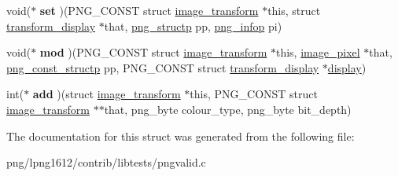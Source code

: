 \begin{DoxyCompactItemize}
\item 
\hypertarget{structimage__transform_a46bbeb277b3ae87e41476157d5fa550b}{void($\ast$ {\bfseries set} )(P\+N\+G\+\_\+\+C\+O\+N\+S\+T struct \hyperlink{structimage__transform}{image\+\_\+transform} $\ast$this, struct \hyperlink{structtransform__display}{transform\+\_\+display} $\ast$that, \hyperlink{structpng__struct__def}{png\+\_\+structp} pp, \hyperlink{structpng__info__def}{png\+\_\+infop} pi)}\label{structimage__transform_a46bbeb277b3ae87e41476157d5fa550b}

\item 
\hypertarget{structimage__transform_a3e3c124d62e5215d4041010eb8108a6d}{void($\ast$ {\bfseries mod} )(P\+N\+G\+\_\+\+C\+O\+N\+S\+T struct \hyperlink{structimage__transform}{image\+\_\+transform} $\ast$this, \hyperlink{structimage__pixel}{image\+\_\+pixel} $\ast$that, \hyperlink{structpng__struct__def}{png\+\_\+const\+\_\+structp} pp, P\+N\+G\+\_\+\+C\+O\+N\+S\+T struct \hyperlink{structtransform__display}{transform\+\_\+display} $\ast$\hyperlink{structdisplay}{display})}\label{structimage__transform_a3e3c124d62e5215d4041010eb8108a6d}

\item 
\hypertarget{structimage__transform_a094546647e50984d8f0c5bb33a5499d5}{int($\ast$ {\bfseries add} )(struct \hyperlink{structimage__transform}{image\+\_\+transform} $\ast$this, P\+N\+G\+\_\+\+C\+O\+N\+S\+T struct \hyperlink{structimage__transform}{image\+\_\+transform} $\ast$$\ast$that, png\+\_\+byte colour\+\_\+type, png\+\_\+byte bit\+\_\+depth)}\label{structimage__transform_a094546647e50984d8f0c5bb33a5499d5}

\end{DoxyCompactItemize}


The documentation for this struct was generated from the following file\+:\begin{DoxyCompactItemize}
\item 
png/lpng1612/contrib/libtests/pngvalid.\+c\end{DoxyCompactItemize}
